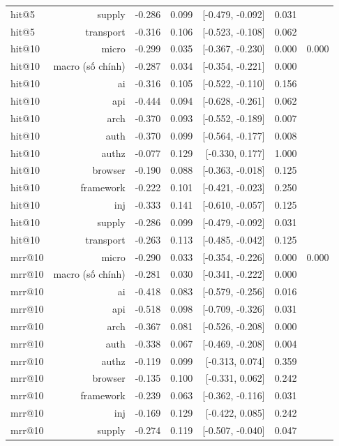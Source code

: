 \begin{table}[ht]
\begin{tabular}{lrrrrrr}
hit@5 & supply & -0.286 & 0.099 & [-0.479, -0.092] & 0.031 &  \\
hit@5 & transport & -0.316 & 0.106 & [-0.523, -0.108] & 0.062 &  \\
hit@10 & micro & -0.299 & 0.035 & [-0.367, -0.230] & 0.000 & 0.000 \\
hit@10 & macro (số chính) & -0.287 & 0.034 & [-0.354, -0.221] & 0.000 &  \\
hit@10 & ai & -0.316 & 0.105 & [-0.522, -0.110] & 0.156 &  \\
hit@10 & api & -0.444 & 0.094 & [-0.628, -0.261] & 0.062 &  \\
hit@10 & arch & -0.370 & 0.093 & [-0.552, -0.189] & 0.007 &  \\
hit@10 & auth & -0.370 & 0.099 & [-0.564, -0.177] & 0.008 &  \\
hit@10 & authz & -0.077 & 0.129 & [-0.330, 0.177] & 1.000 &  \\
hit@10 & browser & -0.190 & 0.088 & [-0.363, -0.018] & 0.125 &  \\
hit@10 & framework & -0.222 & 0.101 & [-0.421, -0.023] & 0.250 &  \\
hit@10 & inj & -0.333 & 0.141 & [-0.610, -0.057] & 0.125 &  \\
hit@10 & supply & -0.286 & 0.099 & [-0.479, -0.092] & 0.031 &  \\
hit@10 & transport & -0.263 & 0.113 & [-0.485, -0.042] & 0.125 &  \\
mrr@10 & micro & -0.290 & 0.033 & [-0.354, -0.226] & 0.000 & 0.000 \\
mrr@10 & macro (số chính) & -0.281 & 0.030 & [-0.341, -0.222] & 0.000 &  \\
mrr@10 & ai & -0.418 & 0.083 & [-0.579, -0.256] & 0.016 &  \\
mrr@10 & api & -0.518 & 0.098 & [-0.709, -0.326] & 0.031 &  \\
mrr@10 & arch & -0.367 & 0.081 & [-0.526, -0.208] & 0.000 &  \\
mrr@10 & auth & -0.338 & 0.067 & [-0.469, -0.208] & 0.004 &  \\
mrr@10 & authz & -0.119 & 0.099 & [-0.313, 0.074] & 0.359 &  \\
mrr@10 & browser & -0.135 & 0.100 & [-0.331, 0.062] & 0.242 &  \\
mrr@10 & framework & -0.239 & 0.063 & [-0.362, -0.116] & 0.031 &  \\
mrr@10 & inj & -0.169 & 0.129 & [-0.422, 0.085] & 0.242 &  \\
mrr@10 & supply & -0.274 & 0.119 & [-0.507, -0.040] & 0.047 &  \\

\end{tabular}
\end{table}
